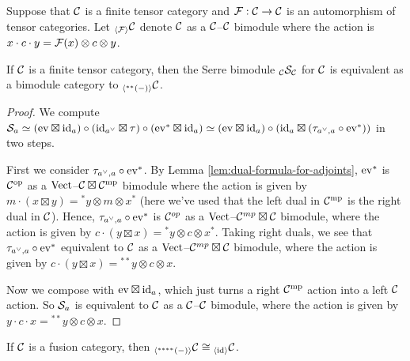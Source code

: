 \documentclass{amsart}
\begin{document}
\begin{definition}
Suppose that $\mathcal C$ is a finite tensor category and $\mathcal F: \mathcal C \rightarrow \mathcal C$ is an automorphism of tensor categories.  Let ${}_{\langle\mathcal F\rangle} \mathcal C$ denote $\mathcal C$ as a $\mathcal C$--$\mathcal C$ bimodule where the action is $x \cdot c \cdot y = \mathcal F(x) \otimes c \otimes y$.  

 
\end{definition}

\begin{theorem} \label{thm-serre}
If $\mathcal C$ is a finite tensor category, then the Serre bimodule ${}_{\mathcal C} {\mathcal S}_{\mathcal C}$ for $\mathcal C$ is equivalent as a bimodule category to ${}_{\langle{}^{**}{(-)}\rangle} \mathcal C$.
\end{theorem}

\begin{proof}
We compute $\mathcal S_a \simeq (\mathrm{ev} \boxtimes \mathrm{id}_a) \circ (\mathrm{id}_{a^{\vee}} \boxtimes \tau) \circ (\mathrm{ev}^{*} \boxtimes \mathrm{id}_a) \simeq (\mathrm{ev} \boxtimes \mathrm{id}_a) \circ (\mathrm{id}_a \boxtimes (\tau_{a^\vee,a} \circ  \mathrm{ev}^*))$ in two steps.  

First we consider $\tau_{a^\vee,a} \circ  \mathrm{ev}^*$.  By Lemma \ref{lem:dual-formula-for-adjoints}, $\mathrm{ev}^*$ is $\mathcal C^{\mathrm{op}}$ as a $\mathrm{Vect}$--${\mathcal C \boxtimes \mathcal C^{\mathrm{mp}}}$ bimodule where the action is given by $m\cdot (x \boxtimes y) = {}^*y \otimes m \otimes x^*$ (here we've used that the left dual in $\mathcal C^{\mathrm{mp}}$ is the right dual in $\mathcal C$).  Hence, $\tau_{a^\vee,a} \circ  \mathrm{ev}^*$ is $\mathcal C^{op}$ as a $\mathrm{Vect}$--$\mathcal C^{mp} \boxtimes \mathcal C$ bimodule, where the action is given by $c \cdot (y \boxtimes x) =  {}^*y \otimes c \otimes x^*$.  Taking right duals, we see that $\tau_{a^\vee,a} \circ  \mathrm{ev}^*$ equivalent to $\mathcal C$ as a $\mathrm{Vect}$--$\mathcal C^{mp} \boxtimes \mathcal C$ bimodule, where the action is given by $c \cdot (y \boxtimes x) =  {}^{**}y \otimes c \otimes x$.

Now we compose with $\mathrm{ev} \boxtimes \mathrm{id}_a$, which just turns a right $\mathcal C^{\mathrm{mp}}$ action into a left $\mathcal C$ action.  So $\mathcal S_a$ is equivalent to $\mathcal C$ as a  $\mathcal C$--$\mathcal C$ bimodule, where the action is given by $y \cdot c \cdot x=  {}^{**}y \otimes c \otimes x$.
\end{proof}

\begin{corollary}
If $\mathcal C$ is a fusion category, then ${}_{\langle{}^{****}(-)\rangle} \mathcal C \cong {}_{\langle\mathrm{id}\rangle} \mathcal C$.
\end{corollary}
\end{document}
